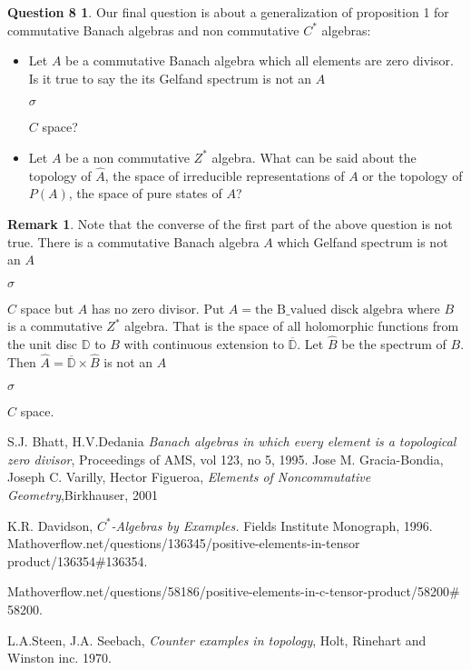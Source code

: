\documentclass[a4paper,10pt]{amsart}
\theoremstyle{definition}
\newtheorem*{remark}{Remark  }
\newtheorem*{question8} {Question  8}
\theoremstyle{plain}
\begin{document}
\begin{question8}
Our  final  question is  about  a generalization of proposition 1 for  commutative Banach  algebras and  non commutative  $C^{*}$  algebras:
\begin{itemize}

\item Let $A$  be  a  commutative  Banach  algebra which all elements  are zero  divisor. Is it true to say the its Gelfand  spectrum   is  not  an $A$\begin{Large}${\sigma}$\end{Large}$C$  space?
\item Let  $A$  be  a non commutative  $Z^{*}$  algebra. What can be  said  about the topology of $\widehat{A}$, the  space of irreducible representations of $A$ or the topology of $P(A)$, the  space  of  pure  states of $A$?
\end{itemize}
\end{question8}
\begin{remark}
Note that the converse of the first part of the  above  question is  not true. There is a  commutative  Banach  algebra $A$ which Gelfand  spectrum is  not an  $A$\begin{Large}${\sigma}$\end{Large}$C$  space but $A$ has no zero divisor. Put $A=\text{the B\_valued disck algebra}$ where $B$ is  a commutative  $Z^{*}$  algebra.   That is the  space of all holomorphic  functions  from the unit disc
$\mathbb{D}$ to $B$ with continuous  extension to $\overline{\mathbb{D}}$. Let $\widehat{B}$ be  the spectrum of $B$.
Then $\widehat{A}=\overline{\mathbb{D}} \times \widehat{B}$ is   not  an $A$\begin{Large}${\sigma}$\end{Large}$C$    space.

\end{remark}

\bigskip

\begin{thebibliography}{9}

   S.J. Bhatt, H.V.Dedania \emph{Banach  algebras in which  every element is  a topological zero divisor}, Proceedings of AMS, vol 123, no 5, 1995.
  Jose M. Gracia-Bondia, Joseph C. Varilly, Hector Figueroa, \emph{Elements of Noncommutative Geometry},Birkhauser, 2001

  K.R. Davidson, \emph{$C^{*}$-Algebras by Examples.}   Fields  Institute Monograph, 1996.
  Mathoverflow.net/questions/136345/positive-elements-in-tensor product/136354\#136354.

  Mathoverflow.net/questions/58186/positive-elements-in-c-tensor-product/58200\# 58200.

  L.A.Steen, J.A. Seebach, \emph{Counter examples in topology}, Holt, Rinehart and Winston inc. 1970.

\end{thebibliography}
\end{document}
